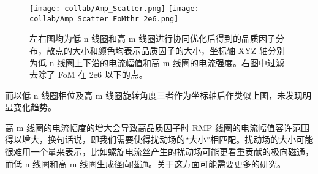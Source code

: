   \begin{figure}[htbp]
    \centering%
    \texttt{[image: collab/Amp\_Scatter.png]}
    \texttt{[image: collab/Amp\_Scatter\_FoMthr\_2e6.png]}
    \caption{左右图均为低 n 线圈和高 m 线圈进行协同优化后得到的品质因子分布，散点的大小和颜色均表示品质因子的大小，坐标轴 XYZ 轴分别为低 n 线圈上下沿的电流幅值和高 m 线圈的电流强度。右图中过滤去除了 FoM 在 2e6 以下的点。}
    \label{fig:lown-highm-scatter}
  \end{figure}

  而以低 n 线圈相位及高 m 线圈旋转角度三者作为坐标轴后作类似上图，未发现明显变化趋势。

  高 m 线圈的电流幅度的增大会导致高品质因子时 RMP 线圈的电流幅值容许范围得以增大，换句话说，即我们需要使得扰动场的“大小”相匹配。扰动场的大小可能很难用一个量来表示，比如螺旋电流丝产生的扰动场可能更看重贡献的极向磁通，而低 n 线圈和高 m 线圈生成径向磁通。关于这方面可能需要更多的研究。

  
  
  


  


    
  


    
  



